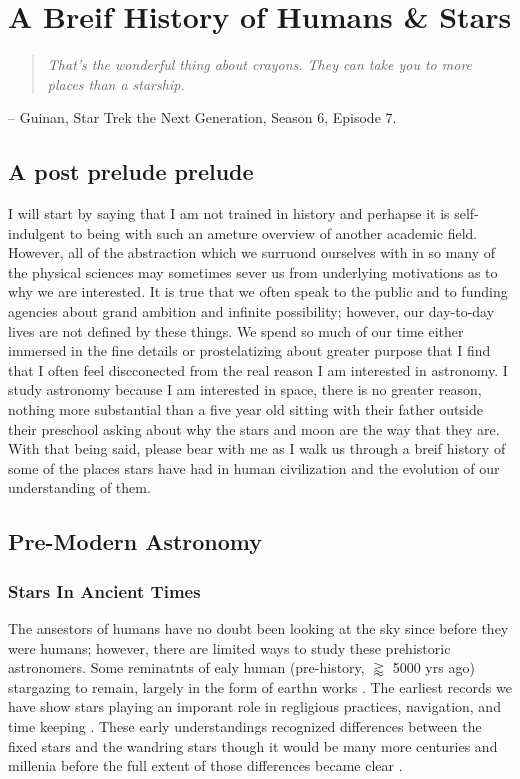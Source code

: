 \chapter{A Breif History of Humans \& Stars}
\begin{quote}\em
  That's the wonderful thing about crayons. They can take you to more places than a starship.
\end{quote}
\begin{flushright}
-- Guinan, Star Trek the Next Generation, Season 6, Episode 7.
\end{flushright}
\section{A post prelude prelude}
I will start by saying that I am not trained in history and perhapse it is
self-indulgent to being with such an ameture overview of another academic
field. However, all of the abstraction which we surruond ourselves with in so
many of the physical sciences may sometimes sever us from underlying
motivations as to why we are interested. It is true that we often speak to the
public and to funding agencies about grand ambition and infinite possibility;
however, our day-to-day lives are not defined by these things. We spend so much
of our time either immersed in the fine details or prostelatizing about greater
purpose that I find that I often feel discconected from the real reason I am
interested in astronomy. I study astronomy because I am interested in space,
there is no greater reason, nothing more substantial than a five year old
sitting with their father outside their preschool asking about why the stars
and moon are the way that they are. With that being said, please bear with me
as I walk us through a breif history of some of the places stars have had in
human civilization and the evolution of our understanding of them.

\section{Pre-Modern Astronomy}
\subsection{Stars In Ancient Times}
The ansestors of humans have no doubt been looking at the sky since before they
were humans; however, there are limited ways to study these prehistoric
astronomers. Some reminatnts of ealy human (pre-history, $\gtrapprox$ 5000 yrs
ago) stargazing to remain, largely in the form of earthn works \addcite. The
earliest records we have show stars playing an imporant role in regligious
practices, navigation, and time keeping \addcite. These early understandings
recognized differences between the fixed stars and the wandring stars though
it would be many more centuries and millenia before the full extent of those
differences became clear \addcite.

